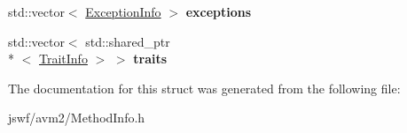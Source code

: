 \begin{DoxyCompactItemize}
\item 
\hypertarget{structjswf_1_1avm2_1_1_method_body_a6550b0bdc8c27fb534d263b832ac265a}{std\+::vector$<$ \hyperlink{structjswf_1_1avm2_1_1_exception_info}{Exception\+Info} $>$ {\bfseries exceptions}}\label{structjswf_1_1avm2_1_1_method_body_a6550b0bdc8c27fb534d263b832ac265a}

\item 
\hypertarget{structjswf_1_1avm2_1_1_method_body_ae328107b045423b2024881158c8d3d92}{std\+::vector$<$ std\+::shared\+\_\+ptr\\*
$<$ \hyperlink{structjswf_1_1avm2_1_1_trait_info}{Trait\+Info} $>$ $>$ {\bfseries traits}}\label{structjswf_1_1avm2_1_1_method_body_ae328107b045423b2024881158c8d3d92}

\end{DoxyCompactItemize}


The documentation for this struct was generated from the following file\+:\begin{DoxyCompactItemize}
\item 
jswf/avm2/Method\+Info.\+h\end{DoxyCompactItemize}
